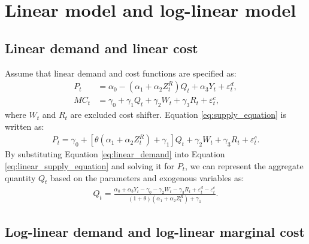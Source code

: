 \documentclass[11pt, a4paper]{article}
\begin{document}

\section{Linear model and log-linear model}

\subsection{Linear demand and linear cost}
Assume that linear demand and cost functions are specified as:
\begin{align}
    P_t &= \alpha_0 - (\alpha_1 + \alpha_2Z^{R}_{t})Q_t + \alpha_3 Y_t + \varepsilon^{d}_{t},\label{eq:linear_demand}\\
    MC_t &= \gamma_0  + \gamma_1 Q_{t} + \gamma_2 W_{t} + \gamma_3 R_t + \varepsilon^{c}_{t},\label{eq:linear_marginal_cost}
\end{align}
where $W_{t}$ and $R_t$ are excluded cost shifter. Equation \eqref{eq:supply_equation} is written as:
\begin{align}
    P_t = \gamma_0 + [\theta(\alpha_1 + \alpha_2Z^{R}_{t})+ \gamma_1] Q_t   + \gamma_2 W_{t} + \gamma_3 R_t + \varepsilon^{c}_{t}.\label{eq:linear_supply_equation}
\end{align}
By substituting Equation \eqref{eq:linear_demand} into Equation \eqref{eq:linear_supply_equation} and solving it for $P_t$, we can represent the aggregate quantity $Q_t$ based on the parameters and exogenous variables as:
\begin{align*}
    Q_t =  \frac{\alpha_0 + \alpha_3 Y_t - \gamma_0 - \gamma_2 W_{t} - \gamma_3 R_t + \varepsilon^{d}_{t} - \varepsilon^{c}_{t}}{(1 + \theta) (\alpha_1 + \alpha_2 Z^{R}_{t}) + \gamma_1}.
\end{align*}


\subsection{Log-linear demand and log-linear marginal cost}
\end{document}

